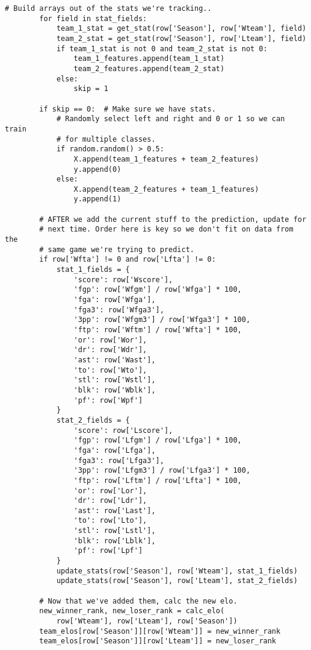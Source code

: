 \documentclass[onecolumn, draftclsnofoot,10pt, compsoc]{IEEEtran}
\begin{document}
\begin{lstlisting}[caption={mm.py, where basketball statistics are read and fed into Scikit-Learn machine learning algorithms. Then, the resulting March Madness bracket is generated.}]
        # Build arrays out of the stats we're tracking..
        for field in stat_fields:
            team_1_stat = get_stat(row['Season'], row['Wteam'], field)
            team_2_stat = get_stat(row['Season'], row['Lteam'], field)
            if team_1_stat is not 0 and team_2_stat is not 0:
                team_1_features.append(team_1_stat)
                team_2_features.append(team_2_stat)
            else:
                skip = 1

        if skip == 0:  # Make sure we have stats.
            # Randomly select left and right and 0 or 1 so we can train
            # for multiple classes.
            if random.random() > 0.5:
                X.append(team_1_features + team_2_features)
                y.append(0)
            else:
                X.append(team_2_features + team_1_features)
                y.append(1)

        # AFTER we add the current stuff to the prediction, update for
        # next time. Order here is key so we don't fit on data from the
        # same game we're trying to predict.
        if row['Wfta'] != 0 and row['Lfta'] != 0:
            stat_1_fields = {
                'score': row['Wscore'],
                'fgp': row['Wfgm'] / row['Wfga'] * 100,
                'fga': row['Wfga'],
                'fga3': row['Wfga3'],
                '3pp': row['Wfgm3'] / row['Wfga3'] * 100,
                'ftp': row['Wftm'] / row['Wfta'] * 100,
                'or': row['Wor'],
                'dr': row['Wdr'],
                'ast': row['Wast'],
                'to': row['Wto'],
                'stl': row['Wstl'],
                'blk': row['Wblk'],
                'pf': row['Wpf']
            }
            stat_2_fields = {
                'score': row['Lscore'],
                'fgp': row['Lfgm'] / row['Lfga'] * 100,
                'fga': row['Lfga'],
                'fga3': row['Lfga3'],
                '3pp': row['Lfgm3'] / row['Lfga3'] * 100,
                'ftp': row['Lftm'] / row['Lfta'] * 100,
                'or': row['Lor'],
                'dr': row['Ldr'],
                'ast': row['Last'],
                'to': row['Lto'],
                'stl': row['Lstl'],
                'blk': row['Lblk'],
                'pf': row['Lpf']
            }
            update_stats(row['Season'], row['Wteam'], stat_1_fields)
            update_stats(row['Season'], row['Lteam'], stat_2_fields)

        # Now that we've added them, calc the new elo.
        new_winner_rank, new_loser_rank = calc_elo(
            row['Wteam'], row['Lteam'], row['Season'])
        team_elos[row['Season']][row['Wteam']] = new_winner_rank
        team_elos[row['Season']][row['Lteam']] = new_loser_rank


\end{lstlisting}
\end{document}
